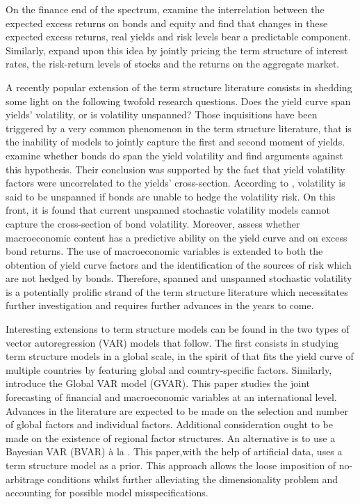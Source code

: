 On the finance end of the spectrum, \cite{campbell_2003} examine the interrelation between the expected excess returns on bonds and equity and find that changes in these expected excess returns, real yields and risk levels bear a predictable component. Similarly, \cite{lettau_2011} expand upon this idea by jointly pricing the term structure of interest rates, the risk-return levels of stocks and the returns on the aggregate market.

A recently popular extension of the term structure literature consists in shedding some light on the following twofold research questions. Does the yield curve span yields' volatility, or is volatility unspanned? Those inquisitions have been triggered by a very common phenomenon in the term structure literature, that is the inability of models to jointly capture the first and second moment of yields. \cite{andersen_2007} examine whether bonds do span the yield volatility and find arguments against this hypothesis. Their conclusion was supported by the fact that yield volatility factors were uncorrelated to the yields' cross-section. According to \cite{joslin2_}, volatility is said to be unspanned if bonds are unable to hedge the volatility risk. On this front, it is found that current unspanned stochastic volatility models cannot capture the cross-section of bond volatility. 
Moreover, \cite{giannone_} assess whether macroeconomic content has a predictive ability on the yield curve and on excess bond returns. The use of macroeconomic variables is extended to both the obtention of yield curve factors and the identification of the sources of risk which are not hedged by bonds. Therefore, spanned and unspanned stochastic volatility is a potentially prolific strand of the term structure literature which necessitates further investigation and requires further advances in the years to come. 

Interesting extensions to term structure models can be found in the two types of vector autoregression (VAR) models that follow. The first consists in studying term structure models in a global scale, in the spirit of \cite{diebold_2008} that fits the yield curve of multiple countries by featuring global and country-specific factors. Similarly, \cite{pesaran_2014} introduce the Global VAR model (GVAR). This paper studies the joint forecasting of financial and macroeconomic variables at an international level. Advances in the literature are expected to be made on the selection and number of global factors and individual factors. Additional consideration ought to be made on the existence of regional factor structures. An alternative is to use a Bayesian VAR (BVAR) \`a la \cite{carriero_2011}. This paper,with the help of artificial data, uses a term structure model as a prior. This approach allows the loose imposition of no-arbitrage conditions whilst further alleviating the dimensionality problem and accounting for possible model misspecifications.   


